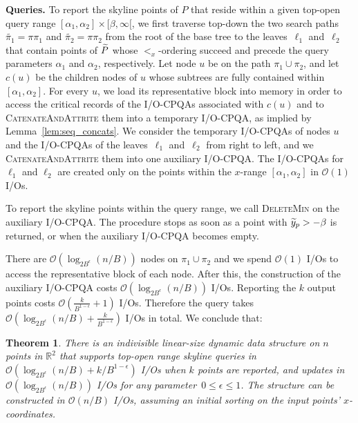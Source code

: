 \documentclass{sig-alternate}
\newtheorem{theorem}{Theorem}
\def\real{\mathbb{R}}
\def\extraspacing{\vspace{2mm} \noindent}
\newcommand{\bigO}{\mathcal{O}}
\renewcommand{\(}{\left(}
\renewcommand{\)}{\right)}
\begin{document}
\extraspacing\textbf{Queries.} To report the skyline points of $P$ that reside
within a given top-open query range $[\alpha_1,\alpha_2] \times [\beta,
\infty[$, we first traverse top-down the two search paths $\widetilde{\pi_1} =
\pi \pi_1$ and $\widetilde{\pi_2} = \pi \pi_2$ from the root of the base tree to
the leaves~$\ell_1$ and~$\ell_2$ that contain points of $\widetilde{P}$ whose
$<_x$-ordering succeed and precede the query parameters $\alpha_1$ and
$\alpha_2$, respectively. Let node $u$ be on the path $\pi_1 \cup \pi_2$, and
let $c(u)$ be the children nodes of $u$ whose subtrees are fully contained
within $[\alpha_1,\alpha_2]$. For every $u$, we load its representative block
into memory in order to access the critical records of the I/O-CPQAs associated
with $c(u)$ and to \textsc{CatenateAndAttrite} them into a temporary I/O-CPQA,
as implied by Lemma~\ref{lem:seq_concats}. We consider the temporary I/O-CPQAs
of nodes $u$ and the I/O-CPQAs of the leaves~$\ell_1$ and~$\ell_2$ from right to
left, and we \textsc{CatenateAndAttrite} them into one auxiliary I/O-CPQA. The
I/O-CPQAs for $\ell_1$ and $\ell_2$ are created only on the points within the
$x$-range $[\alpha_1,\alpha_2]$ in $\bigO(1)$ I/Os.

To report the skyline points within the query range, we call \textsc{DeleteMin}
on the auxiliary I/O-CPQA. The procedure stops as soon as a point with
$\widetilde{y}_p > -\beta$ is returned, or when the auxiliary I/O-CPQA becomes empty.

There are $\bigO(\log_{2B^\epsilon} (n/B))$ nodes on $\pi_1 \cup \pi_2$ and we
spend $\bigO (1)$ I/Os to access the representative block of each node. After
this, the construction of the auxiliary I/O-CPQA costs $\bigO(\log_{2B^\epsilon}
(n/B))$ I/Os. Reporting the $k$ output points costs $\bigO
(\frac{k}{B^{1-\epsilon}}+ 1)$ I/Os. Therefore the query takes
$\bigO(\log_{2B^\epsilon}(n/B)+ \frac{k}{B^{1-\epsilon}})$ I/Os in total.  We
conclude that:

\begin{theorem} \label{thm:3sided}
  There is an indivisible linear-size dynamic data structure on $n$ points in
  $\real^2$ that supports top-open range skyline queries in~$\bigO
  (\log_{2B^{\epsilon}} (n/B) + k/B^{1-\epsilon})$ I/Os when $k$ points are
  reported, and updates in~$\bigO(\log_{2B^{\epsilon}} (n/B))$ I/Os for any
  parameter~$0 \leq \epsilon \leq 1$. The structure can be constructed in
  $\bigO(n/B)$ I/Os, assuming an initial sorting on the input points'
  $x$-coordinates.
\end{theorem}
\end{document}
